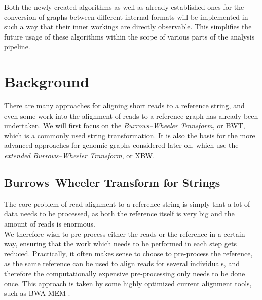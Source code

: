 \documentclass[a4paper,12pt,twoside,BCOR=10mm]{scrbook}
\begin{document}
Both the newly created algorithms as well as already established ones
for the conversion of graphs between different internal formats
will be implemented in such a way that their inner workings
are directly observable. This simplifies the future usage of these algorithms
within the scope of various parts of the analysis pipeline.

\chapter{Background}
%

There are many approaches for aligning short reads to a reference string,
and even some work into the alignment of reads to a reference graph has already been
undertaken.
We will first focus on the \textit{Burrows--Wheeler Transform}, or BWT, which is a commonly used string transformation.
It is also the basis for the more advanced approaches for genomic graphs considered later on,
which use the \textit{extended Burrows--Wheeler Transform}, or XBW.

\section{Burrows--Wheeler Transform for Strings}
\label{sec:bwt_for_strings}

The core problem of read alignment to a reference string is simply that a
lot of data needs to be processed, as both the reference itself is very big
and the amount of reads is enormous. \\
We therefore wish to pre-process either the reads or the reference in a certain way,
ensuring that the work which needs to be performed in each step gets reduced.
Practically, it often makes sense to choose to pre-process the reference,
as the same reference can be used to align reads for several individuals,
and therefore the computationally expensive pre-processing only needs to be done once.
This approach is taken by some highly optimized current alignment tools,
such as BWA-MEM \citep{Li2013}.
\end{document}

